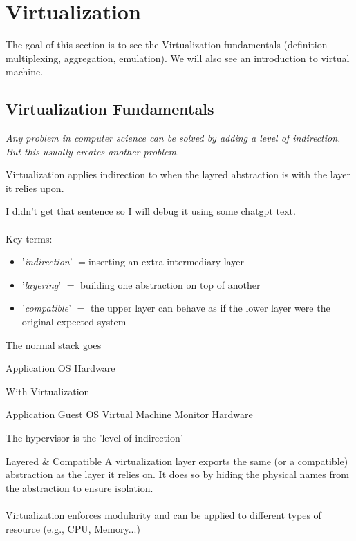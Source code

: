 \documentclass[a4paper]{book}
\begin{document}
\section{Virtualization}
The goal of this section is to see the Virtualization fundamentals (definition multiplexing, aggregation, emulation). We will also see an introduction to virtual machine.

\subsection{Virtualization Fundamentals}

\begin{center}
    \textit{Any problem in computer science can be solved by adding a level of indirection. But this usually creates another problem.}
\end{center}
Virtualization applies indirection to  when the layred abstraction is  with the layer it relies upon.

\begin{framedremark}
I didn't get that sentence so I will debug it using some chatgpt text.\\
$ $\\
Key terms:
\begin{itemize}
    \item '\textit{indirection}' $= $inserting an extra intermediary layer
    \item '\textit{layering}' $ = $ building one abstraction on top of another
    \item '\textit{compatible}' $ =  $ the upper layer can behave as if the lower layer were the original expected system
\end{itemize}
The normal stack goes 
\begin{center}
    Application \textrightarrow OS \textrightarrow Hardware
\end{center}
With Virtualization
\begin{center}
    Application \textrightarrow Guest OS \textrightarrow Virtual Machine Monitor \textrightarrow Hardware
\end{center}
The hypervisor is the 'level of indirection'
\end{framedremark}



\begin{parag}{Layered \& Compatible}
	A virtualization layer exports the same (or a compatible) abstraction as the layer it relies on. It does so by hiding the physical names from the abstraction to ensure isolation.\\
	$ $\\
	Virtualization enforces modularity and can be applied to different types of resource (e.g., CPU, Memory...)
\end{parag}
\end{document}
